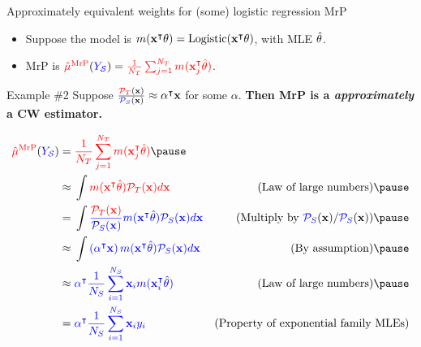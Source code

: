 
\begin{frame}[t]{Approximately equivalent weights for (some) logistic regression MrP}

\def\alphav{\mathbf{\alpha}}
%
\begin{itemize}
    \item Suppose the model is $m(\mathbf{x}^\intercal \theta) = \mathrm{Logistic}(\mathbf{x}^\intercal \theta)$, with MLE $\hat{\theta}$.
    \item MrP is $\textcolor{red}{\hat{\mu}^{\mathrm{MrP}}}(\textcolor{blue}{\textcolor{blue}{Y_{\mathcal{S}}}}) = \textcolor{red}{\frac{1}{{N_T}} \sum_{j=1}^{N_T} m(\mathbf{x}_j^\intercal \hat{\theta})}$.
\end{itemize}
%
\begin{block}{Example \#2}
Suppose
    $\frac{\tarcol{\ptar}(\x)}{\surcol{\psur}(\x)} \approx \alphav^\trans \x$ for some $\alpha$.
    \textbf{Then MrP is a \emph{approximately} a CW estimator.}
\end{block}\pause

$$
\begin{aligned}
\muhatmrp ={}& \tarcol{\meantar \m(\x_j^\trans \thetahat)} \pause
\\ \approx{}&
    \int \tarcol{
        \m(\x^\trans \thetahat) \ptar(\x) d\x
    }
    & \textrm{(Law of large numbers)} \pause
\\ ={}&
    \int
    \surcol{
        \frac{\tarcol{\ptar(\x)}}{\psur(\x)} \m(\x^\trans \thetahat) \psur(\x) d\x
    }
    & \textrm{(Multiply by $\psur(\x) / \psur(\x)$)} \pause
\\ \approx{}&
    \int \surcol{
        \left( \alphav^\trans \x\right) \m(\x^\trans \thetahat) \psur(\x) d\x
    }
    & \textrm{(By assumption)} \pause
\\ \approx{}&
    \surcol{
        \alphav^\trans \meansur \x_i \m(\x_i^\trans \thetahat)
    }
    & \textrm{(Law of large numbers)}\pause
\\={}&
    \surcol{
        \alphav^\trans \meansur \x_i \y_i
    }
    & \textrm{(Property of exponential family MLEs)}
\end{aligned}
$$


\end{frame}



